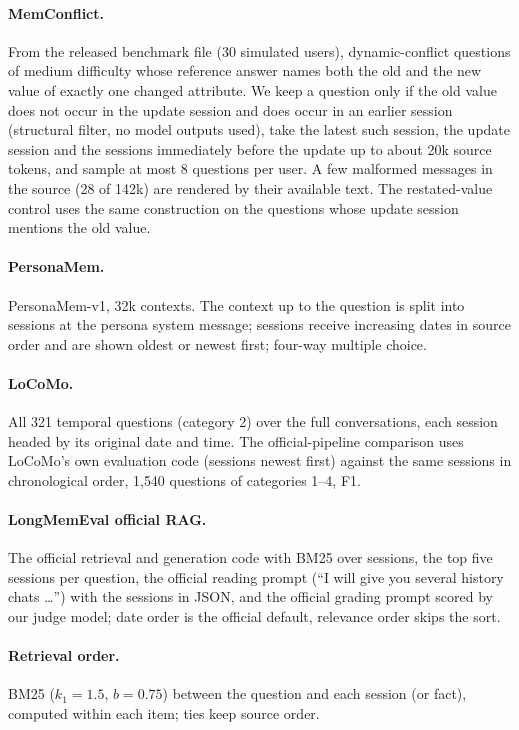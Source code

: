 \documentclass[11pt]{article}
\begin{document}
\paragraph{MemConflict.} From the released benchmark file (30 simulated users), dynamic-conflict questions of medium difficulty whose reference answer names both the old and the new value of exactly one changed attribute. We keep a question only if the old value does not occur in the update session and does occur in an earlier session (structural filter, no model outputs used), take the latest such session, the update session and the sessions immediately before the update up to about 20k source tokens, and sample at most 8 questions per user. A few malformed messages in the source (28 of 142k) are rendered by their available text. The restated-value control uses the same construction on the questions whose update session mentions the old value.

\paragraph{PersonaMem.} PersonaMem-v1, 32k contexts. The context up to the question is split into sessions at the persona system message; sessions receive increasing dates in source order and are shown oldest or newest first; four-way multiple choice.

\paragraph{LoCoMo.} All 321 temporal questions (category 2) over the full conversations, each session headed by its original date and time. The official-pipeline comparison uses LoCoMo's own evaluation code (sessions newest first) against the same sessions in chronological order, 1{,}540 questions of categories 1--4, F1.

\paragraph{LongMemEval official RAG.} The official retrieval and generation code with BM25 over sessions, the top five sessions per question, the official reading prompt (``I will give you several history chats \ldots'') with the sessions in JSON, and the official grading prompt scored by our judge model; date order is the official default, relevance order skips the sort.

\paragraph{Retrieval order.} BM25 ($k_1 = 1.5$, $b = 0.75$) between the question and each session (or fact), computed within each item; ties keep source order.
\end{document}
